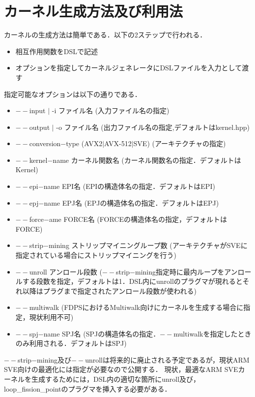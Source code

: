 \documentclass{article}
\begin{document}
\section{カーネル生成方法及び利用法}
カーネルの生成方法は簡単である．以下の2ステップで行われる．
 \begin{itemize}
  \item 相互作用関数をDSLで記述
  \item オプションを指定してカーネルジェネレータにDSLファイルを入力として渡す
 \end{itemize}
 指定可能なオプションは以下の通りである．
  \begin{itemize}
   \item $--$input $|$ -i ファイル名 (入力ファイル名の指定)
   \item $--$output $|$ -o ファイル名 (出力ファイル名の指定,デフォルトはkernel.hpp)
   \item $--$conversion$-$type (AVX2$|$AVX-512$|$SVE) (アーキテクチャの指定)
   \item $--$kernel$-$name カーネル関数名 (カーネル関数名の指定．デフォルトはKernel)
   \item $--$epi$-$name EPI名 (EPIの構造体名の指定．デフォルトはEPI)
   \item $--$epj$-$name EPJ名 (EPJの構造体名の指定．デフォルトはEPJ)
   \item $--$force$-$ame FORCE名 (FORCEの構造体名の指定，デフォルトはFORCE)
   \item $--$strip$-$mining ストリップマイニングループ数 (アーキテクチャがSVEに指定されている場合にストリップマイニングを行う)
   \item $--$unroll アンロール段数 ($--$strip$-$mining指定時に最内ループをアンロールする段数を指定，デフォルトは1．DSL内にunrollのプラグマが現れるとそれ以降はプラグまで指定されたアンロール段数が使われる)
   \item $--$multiwalk (FDPSにおけるMultiwalk向けにカーネルを生成する場合に指定，現状利用不可)
   \item $--$spj$-$name SPJ名 (SPJの構造体名の指定．$--$multiwalkを指定したときのみ利用される．デフォルトはSPJ)
  \end{itemize}
  $--$strip$-$mining及び$--$unrollは将来的に廃止される予定であるが，現状ARM SVE向けの最適化には指定が必要なので公開する．
  現状，最適なARM SVEカーネルを生成するためには，DSL内の適切な箇所にunroll及び，loop\_fission\_pointのプラグマを挿入する必要がある．
\end{document}
